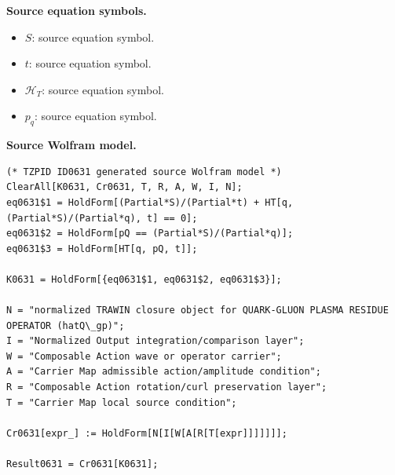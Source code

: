 \begin{minipage}[t]{0.49\linewidth}
\begingroup
\small
\raggedright
\textbf{Source equation symbols.}\par
\begin{itemize}[leftmargin=1.35em,itemsep=1pt,topsep=1pt,parsep=0pt]
    \item $S$: source equation symbol.
    \item $t$: source equation symbol.
    \item $\mathcal{H}_T$: source equation symbol.
    \item $p_q$: source equation symbol.
\end{itemize}
\endgroup
\end{minipage}\hfill
\begin{minipage}[t]{0.47\linewidth}
\begingroup
\scriptsize
\raggedright
\textbf{Source Wolfram model.}\par
\begin{Verbatim}[fontsize=\tiny,breaklines=true,breakanywhere=true]
(* TZPID ID0631 generated source Wolfram model *)
ClearAll[K0631, Cr0631, T, R, A, W, I, N];
eq0631$1 = HoldForm[(Partial*S)/(Partial*t) + HT[q, (Partial*S)/(Partial*q), t] == 0];
eq0631$2 = HoldForm[pQ == (Partial*S)/(Partial*q)];
eq0631$3 = HoldForm[HT[q, pQ, t]];

K0631 = HoldForm[{eq0631$1, eq0631$2, eq0631$3}];

N = "normalized TRAWIN closure object for QUARK-GLUON PLASMA RESIDUE OPERATOR (hatQ\_gp)";
I = "Normalized Output integration/comparison layer";
W = "Composable Action wave or operator carrier";
A = "Carrier Map admissible action/amplitude condition";
R = "Composable Action rotation/curl preservation layer";
T = "Carrier Map local source condition";

Cr0631[expr_] := HoldForm[N[I[W[A[R[T[expr]]]]]]];

Result0631 = Cr0631[K0631];
\end{Verbatim}
\endgroup
\end{minipage}

